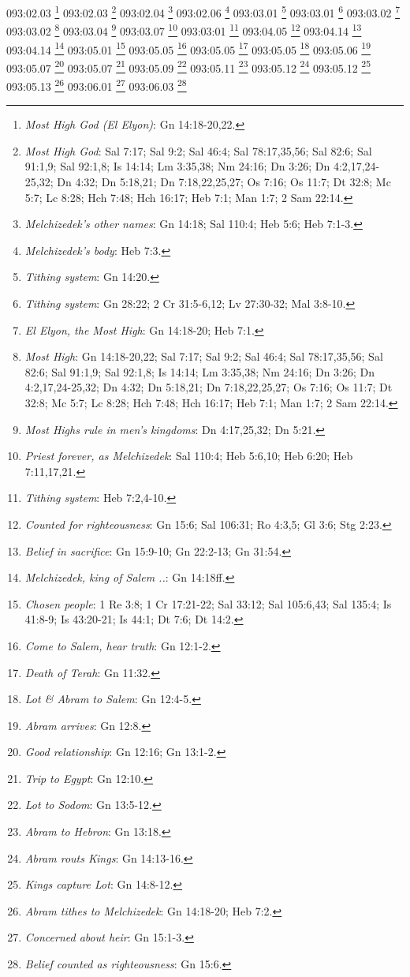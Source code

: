 093:02.03 \footnote{\textit{Most High God (El Elyon)}: Gn 14:18-20,22.}
093:02.03 \footnote{\textit{Most High God}: Sal 7:17; Sal 9:2; Sal 46:4; Sal 78:17,35,56; Sal 82:6; Sal 91:1,9; Sal 92:1,8; Is 14:14; Lm 3:35,38; Nm 24:16; Dn 3:26; Dn 4:2,17,24-25,32; Dn 4:32; Dn 5:18,21; Dn 7:18,22,25,27; Os 7:16; Os 11:7; Dt 32:8; Mc 5:7; Lc 8:28; Hch 7:48; Hch 16:17; Heb 7:1; Man 1:7; 2 Sam 22:14.}
093:02.04 \footnote{\textit{Melchizedek's other names}: Gn 14:18; Sal 110:4; Heb 5:6; Heb 7:1-3.}
093:02.06 \footnote{\textit{Melchizedek's body}: Heb 7:3.}
093:03.01 \footnote{\textit{Tithing system}: Gn 14:20.}
093:03.01 \footnote{\textit{Tithing system}: Gn 28:22; 2 Cr 31:5-6,12; Lv 27:30-32; Mal 3:8-10.}
093:03.02 \footnote{\textit{El Elyon, the Most High}: Gn 14:18-20; Heb 7:1.}
093:03.02 \footnote{\textit{Most High}: Gn 14:18-20,22; Sal 7:17; Sal 9:2; Sal 46:4; Sal 78:17,35,56; Sal 82:6; Sal 91:1,9; Sal 92:1,8; Is 14:14; Lm 3:35,38; Nm 24:16; Dn 3:26; Dn 4:2,17,24-25,32; Dn 4:32; Dn 5:18,21; Dn 7:18,22,25,27; Os 7:16; Os 11:7; Dt 32:8; Mc 5:7; Lc 8:28; Hch 7:48; Hch 16:17; Heb 7:1; Man 1:7; 2 Sam 22:14.}
093:03.04 \footnote{\textit{Most Highs rule in men's kingdoms}: Dn 4:17,25,32; Dn 5:21.}
093:03.07 \footnote{\textit{Priest forever, as Melchizedek}: Sal 110:4; Heb 5:6,10; Heb 6:20; Heb 7:11,17,21.}
093:03:01 \footnote{\textit{Tithing system}: Heb 7:2,4-10.}
093:04.05 \footnote{\textit{Counted for righteousness}: Gn 15:6; Sal 106:31; Ro 4:3,5; Gl 3:6; Stg 2:23.}
093:04.14 \footnote{\textit{Belief in sacrifice}: Gn 15:9-10; Gn 22:2-13; Gn 31:54.}
093:04.14 \footnote{\textit{Melchizedek, king of Salem ..}: Gn 14:18ff.}
093:05.01 \footnote{\textit{Chosen people}: 1 Re 3:8; 1 Cr 17:21-22; Sal 33:12; Sal 105:6,43; Sal 135:4; Is 41:8-9; Is 43:20-21; Is 44:1; Dt 7:6; Dt 14:2.}
093:05.05 \footnote{\textit{Come to Salem, hear truth}: Gn 12:1-2.}
093:05.05 \footnote{\textit{Death of Terah}: Gn 11:32.}
093:05.05 \footnote{\textit{Lot & Abram to Salem}: Gn 12:4-5.}
093:05.06 \footnote{\textit{Abram arrives}: Gn 12:8.}
093:05.07 \footnote{\textit{Good relationship}: Gn 12:16; Gn 13:1-2.}
093:05.07 \footnote{\textit{Trip to Egypt}: Gn 12:10.}
093:05.09 \footnote{\textit{Lot to Sodom}: Gn 13:5-12.}
093:05.11 \footnote{\textit{Abram to Hebron}: Gn 13:18.}
093:05.12 \footnote{\textit{Abram routs Kings}: Gn 14:13-16.}
093:05.12 \footnote{\textit{Kings capture Lot}: Gn 14:8-12.}
093:05.13 \footnote{\textit{Abram tithes to Melchizedek}: Gn 14:18-20; Heb 7:2.}
093:06.01 \footnote{\textit{Concerned about heir}: Gn 15:1-3.}
093:06.03 \footnote{\textit{Belief counted as righteousness}: Gn 15:6.}
